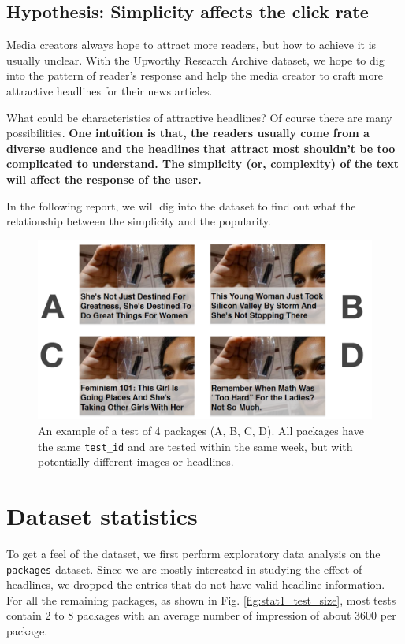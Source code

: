 \documentclass[%
preprint,
 amsmath,amssymb,
 aps,
]{revtex4-2}
\begin{document}
\subsection{Hypothesis: Simplicity affects the click rate}

Media creators always hope to attract more readers, but how to achieve it is usually unclear.
With the Upworthy Research Archive dataset, we hope to dig into the pattern of reader's response and help the media creator to craft more attractive headlines for their news articles.

What could be characteristics of attractive headlines?
Of course there are many possibilities.
\textbf{One intuition is that, the readers usually come from a diverse audience and the headlines that attract most shouldn't be too complicated to understand.
The simplicity (or, complexity) of the text will affect the response of the user.}

In the following report, we will dig into the dataset to find out what the relationship between the simplicity and the popularity.

\begin{figure}[!ht]
    \centering
    \includegraphics[width=0.8\linewidth]{fig/example_test.png}
    \caption{An example of a test of 4 packages (A, B, C, D). All packages have the same \texttt{test\_id} and are tested within the same week, but with potentially different images or headlines.}
    \label{fig:example_test}
\end{figure}

\section{Dataset statistics}

To get a feel of the dataset, we first perform exploratory data analysis on the \texttt{packages} dataset.
Since we are mostly interested in studying the effect of headlines, we dropped the entries that do not have valid headline information.
For all the remaining packages, as shown in Fig. \ref{fig:stat1_test_size}, most tests contain 2 to 8 packages with an average number of impression of about 3600 per package.
\end{document}

